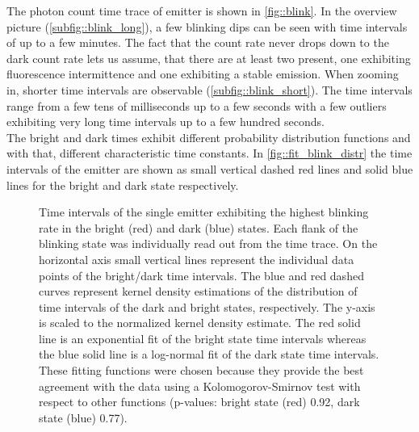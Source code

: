 		The photon count time trace of emitter \emnarrow is shown in \autoref{fig::blink}.
		In the overview picture (\autoref{subfig::blink_long}), a few blinking dips can be seen with time intervals of up to a few minutes.
		The fact that the count rate never drops down to the dark count rate lets us assume, that there are at least two \sivs present, one exhibiting fluorescence intermittence and one exhibiting a stable emission.
		When zooming in, shorter time intervals are observable (\autoref{subfig::blink_short}).
		The time intervals range from a few tens of milliseconds up to a few seconds with a few outliers exhibiting very long time intervals up to a few hundred seconds.
		\\
		The bright and dark times exhibit different probability distribution functions and with that, different characteristic time constants.
		In \autoref{fig::fit_blink_distr} the time intervals of the emitter are shown as small vertical dashed red lines and solid blue lines for the bright and dark state respectively.

		\begin{figure}[htp]
			\centering
			\caption[Distributions of brigth and dark state intervals]{Time intervals of the single emitter exhibiting the highest blinking rate in the bright (red) and dark (blue) states. Each flank of the blinking state was individually read out from the \pl time trace. On the horizontal axis small vertical lines represent the individual data points of the bright/dark time intervals. The blue and red dashed curves represent kernel density estimations of the distribution of time intervals of the dark and bright states, respectively. The y-axis is scaled to the normalized kernel density estimate. The red solid line is an exponential fit of the bright state time intervals whereas the blue solid line is a log-normal fit of the dark state time intervals. These fitting functions were chosen because they provide the best agreement with the data using a Kolomogorov-Smirnov test with respect to other functions (p-values: bright state (red) 0.92, dark state (blue) 0.77).}
			\label{fig::fit_blink_distr}
		\end{figure}

